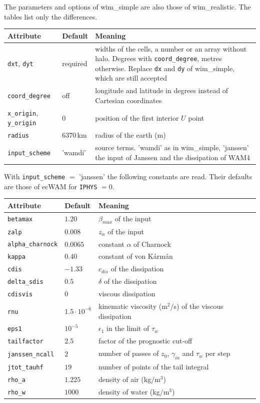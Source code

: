 \documentclass[12pt]{article}
\begin{document}
The parameters and options of wim\_simple are also those of wim\_realistic.
The tables list only the differences.

\begin{longtable}{@{}llp{7.6cm}@{}}
\hline
Attribute & Default & Meaning \\
\hline
\endhead
\verb|dxt|, \verb|dyt| & required & widths of the cells, a number or an array without halo.
  Degrees with \verb|coord_degree|, metres otherwise.
  Replace \verb|dx| and \verb|dy| of wim\_simple, which are still accepted \\
\verb|coord_degree| & off & longitude and latitude in degrees instead of Cartesian coordinates \\
\verb|x_origin|, \verb|y_origin| & $0$ & position of the first interior $U$ point \\
\verb|radius| & $6370\,$km & radius of the earth (m) \\
\verb|input_scheme| & 'wamdi' & source terms. 'wamdi' as in wim\_simple, 'janssen' the input of Janssen and the dissipation of WAM4 \\
\hline
\end{longtable}

\noindent
With \verb|input_scheme| $=$ 'janssen' the following constants are read.
Their defaults are those of ecWAM for \verb|IPHYS| $=0$.

\begin{longtable}{@{}llp{8.6cm}@{}}
\hline
Attribute & Default & Meaning \\
\hline
\endhead
\verb|betamax| & $1.20$ & $\beta_{max}$ of the input \\
\verb|zalp| & $0.008$ & $z_\alpha$ of the input \\
\verb|alpha_charnock| & $0.0065$ & constant $\alpha$ of Charnock \\
\verb|kappa| & $0.40$ & constant of von K\'arm\'an \\
\verb|cdis| & $-1.33$ & $c_{dis}$ of the dissipation \\
\verb|delta_sdis| & $0.5$ & $\delta$ of the dissipation \\
\verb|cdisvis| & $0$ & viscous dissipation \\
\verb|rnu| & $1.5 \cdot 10^{-6}$ & kinematic viscosity (m$^2$/s) of the viscous dissipation \\
\verb|eps1| & $10^{-5}$ & $\epsilon_1$ in the limit of $\tau_w$ \\
\verb|tailfactor| & $2.5$ & factor of the prognostic cut-off \\
\verb|janssen_ncall| & $2$ & number of passes of $z_0$, $\gamma_{in}$ and $\tau_w$ per step \\
\verb|jtot_tauhf| & $19$ & number of points of the tail integral \\
\verb|rho_a| & $1.225$ & density of air (kg/m$^3$) \\
\verb|rho_w| & $1000$ & density of water (kg/m$^3$) \\
\hline
\end{longtable}
\end{document}
